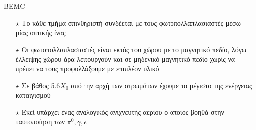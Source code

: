 \documentclass[18pt,notheorems,hyperref={pdfauthor=whatever}]{beamer}
\begin{document}
\begin{frame}{BEMC}
\begin{minipage}{0.47\textwidth}
\begin{figure}
    \end{figure}
    \end{minipage}
    \begin{minipage}{0.5\textwidth}
        \begin{itemize}
            \item[$\star$] Το κάθε τμήμα σπινθηριστή συνδέεται με τους φωτοπολλαπλασιαστές μέσω μίας οπτικής ίνας
            \item[$\star$] Oι φωτοπολλαπλασιαστές είναι εκτός του χώρου με το μαγνητικό πεδίο, λόγω έλλειψης χώρου άρα λειτουργούν και σε μηδενικό μαγνητικό πεδίο χωρίς να πρέπει να τους προφυλλάξουμε με επιπλέον υλικό
            \item[$\star$] Σε βάθος 5.6$X_0$ από την αρχή των στρωμάτων έχουμε το μέγιστο της ενέργειας καταιγισμού
            \item[$\star$] Εκεί υπάρχει ένας αναλογικός ανιχνευτής αερίου ο οποίος βοηθά στην ταυτοποίηση των $\pi^0,\gamma,e$
        \end{itemize}
    \end{minipage}
\end{frame}

%
%
%
\end{document}
